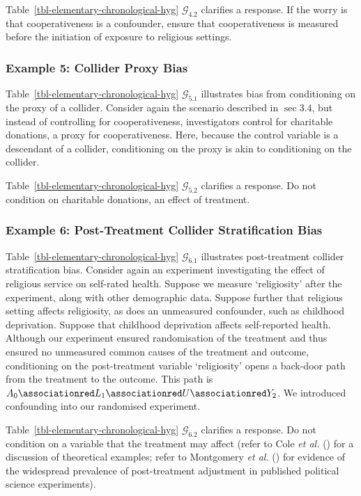 \documentclass[
  single column]{article}
\begin{document}
Table~\ref{tbl-elementary-chronological-hyg} \(\mathcal{G}_{4.2}\)
clarifies a response. If the worry is that cooperativeness is a
confounder, ensure that cooperativeness is measured before the
initiation of exposure to religious settings.

\subsubsection{Example 5: Collider Proxy
Bias}\label{example-5-collider-proxy-bias}

Table~\ref{tbl-elementary-chronological-hyg} \(\mathcal{G}_{5.1}\)
illustrates bias from conditioning on the proxy of a collider. Consider
again the scenario described in \(\sec 3.4\), but instead of controlling
for cooperativeness, investigators control for charitable donations, a
proxy for cooperativeness. Here, because the control variable is a
descendant of a collider, conditioning on the proxy is akin to
conditioning on the collider.

Table~\ref{tbl-elementary-chronological-hyg} \(\mathcal{G}_{5.2}\)
clarifies a response. Do not condition on charitable donations, an
effect of treatment.

\subsubsection{Example 6: Post-Treatment Collider Stratification
Bias}\label{example-6-post-treatment-collider-stratification-bias}

Table~\ref{tbl-elementary-chronological-hyg} \(\mathcal{G}_{6.1}\)
illustrates post-treatment collider stratification bias. Consider again
an experiment investigating the effect of religious service on
self-rated health. Suppose we measure `religiosity' after the
experiment, along with other demographic data. Suppose further that
religious setting affects religiosity, as does an unmeasured confounder,
such as childhood deprivation. Suppose that childhood deprivation
affects self-reported health. Although our experiment ensured
randomisation of the treatment and thus ensured no unmeasured common
causes of the treatment and outcome, conditioning on the post-treatment
variable `religiosity' opens a back-door path from the treatment to the
outcome. This path is
\(A_0 \associationred L_1 \associationred U \associationred Y_2\). We
introduced confounding into our randomised experiment.

Table~\ref{tbl-elementary-chronological-hyg} \(\mathcal{G}_{6.2}\)
clarifies a response. Do not condition on a variable that the treatment
may affect (refer to Cole \emph{et al.} ()
for a discussion of theoretical examples; refer to Montgomery \emph{et
al.} () for evidence of the
widespread prevalence of post-treatment adjustment in published
political science experiments).
\end{document}
